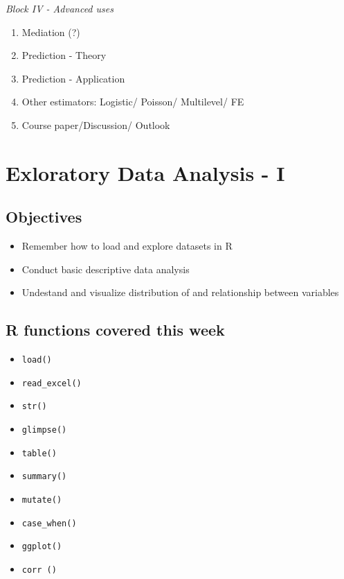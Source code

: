 \documentclass[
]{book}
\providecommand{\tightlist}{%
  \setlength{\itemsep}{0pt}\setlength{\parskip}{0pt}}
\begin{document}
\emph{Block IV - Advanced uses}

\begin{enumerate}
\def\labelenumi{\arabic{enumi}.}
\setcounter{enumi}{9}
\item
  Mediation (?)
\item
  Prediction - Theory
\item
  Prediction - Application
\item
  Other estimators: Logistic/ Poisson/ Multilevel/ FE
\item
  Course paper/Discussion/ Outlook
\end{enumerate}

\hypertarget{eda-1}{%
\chapter{Exloratory Data Analysis - I}\label{eda-1}}

\hypertarget{objectives-1}{%
\section{Objectives}\label{objectives-1}}

\begin{itemize}
\tightlist
\item
  Remember how to load and explore datasets in R
\item
  Conduct basic descriptive data analysis
\item
  Undestand and visualize distribution of and relationship between variables
\end{itemize}

\hypertarget{r-functions-covered-this-week}{%
\section{R functions covered this week}\label{r-functions-covered-this-week}}

\begin{itemize}
\tightlist
\item
  \texttt{load()}
\item
  \texttt{read\_excel()}
\item
  \texttt{str()}
\item
  \texttt{glimpse()}
\item
  \texttt{table()}
\item
  \texttt{summary()}
\item
  \texttt{mutate()}
\item
  \texttt{case\_when()}
\item
  \texttt{ggplot()}
\item
  \texttt{corr\ ()}
\end{itemize}
\end{document}

